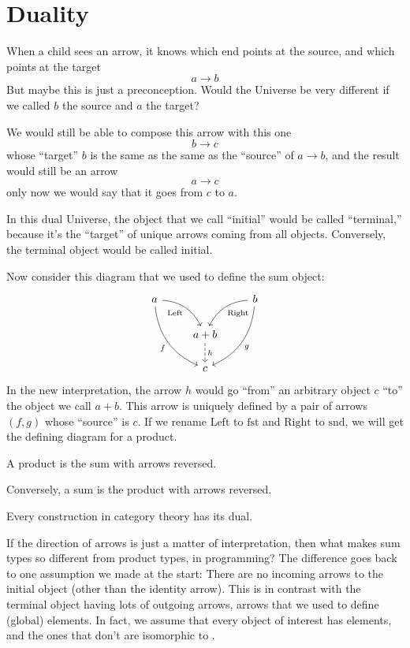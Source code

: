 \documentclass[DaoFP]{subfiles}
\begin{document}
\section{Duality}

When a child sees an arrow, it knows which end points at the source, and which points at the target
\[a \to b \]
But maybe this is just a preconception. Would the Universe be very different if we called $b$ the source and $a$ the target? 

We would still be able to compose this arrow with this one
\[b \to c\]
whose ``target'' $b$ is the same as the same as the ``source'' of $a \to b$, and the result would still be an arrow 
\[a \to c\]
 only now we would say that it goes from $c$ to $a$.

In this dual Universe, the object that we call ``initial'' would be called ``terminal,'' because it's the ``target'' of unique arrows coming from all objects. Conversely, the terminal object would be called initial.

Now consider this diagram that we used to define the sum object:
\[
 \begin{tikzcd}
 a
 \arrow[dr,  bend left, "\text{Left}"']
 \arrow[ddr, bend right, "f"']
 && b
 \arrow[dl, bend right, "\text{Right}"]
 \arrow[ddl, bend left, "g"]
 \\
&a + b
\arrow[d, dashed, "h"]
\\
& c
 \end{tikzcd}
\]
In the new interpretation, the arrow $h$ would go ``from'' an arbitrary object $c$ ``to'' the object we call $a + b$. This arrow is uniquely defined by a pair of arrows $(f, g)$ whose ``source'' is $c$. If we rename $\text{Left}$ to $\text{fst}$ and $\text{Right}$ to $\text{snd}$, we will get  the defining diagram for a product. 

A product is the sum with arrows reversed. 

Conversely, a sum is the product with arrows reversed. 

\medskip

Every construction in category theory has its dual.

\medskip

If the direction of arrows is just a matter of interpretation, then what makes sum types so different from product types, in programming? The difference goes back to one assumption we made at the start: There are no incoming arrows to the initial object (other than the identity arrow). This is in contrast with the terminal object having lots of outgoing arrows, arrows that we used to define (global) elements. In fact, we assume that every object of interest has elements, and the ones that don't are isomorphic to . 
\end{document}
